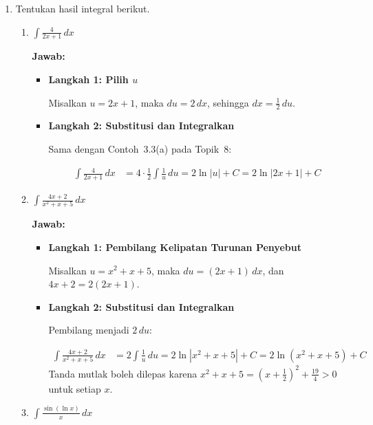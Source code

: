 \documentclass[10pt,a4paper]{article}
\newcounter{eqblock}
\newcommand{\reseteq}{%
  \stepcounter{eqblock}%
  \setcounter{equation}{0}%
  \renewcommand{\theHequation}{\arabic{eqblock}.\arabic{equation}}%
}
\begin{document}
\begin{enumerate}
\begin{enumerate}
\end{enumerate}

\item Tentukan hasil integral berikut.
\begin{enumerate}

\item $\displaystyle\int \frac{4}{2x + 1}\, dx$

\textbf{Jawab:}
\begin{itemize}
\item \textbf{Langkah 1: Pilih $u$}

Misalkan $u = 2x + 1$, maka $du = 2\, dx$, sehingga $dx = \frac{1}{2}\, du$.

\item \textbf{Langkah 2: Substitusi dan Integralkan}

Sama dengan Contoh~3.3(a) pada Topik~8:
\reseteq
\begin{align}
\int \frac{4}{2x + 1}\, dx &= 4 \cdot \frac{1}{2}\int \frac{1}{u}\, du = 2\ln|u| + C = 2\ln|2x + 1| + C
\end{align}
\end{itemize}

\item $\displaystyle\int \frac{4x + 2}{x^2 + x + 5}\, dx$

\textbf{Jawab:}
\begin{itemize}
\item \textbf{Langkah 1: Pembilang Kelipatan Turunan Penyebut}

Misalkan $u = x^2 + x + 5$, maka $du = (2x + 1)\, dx$, dan $4x + 2 = 2(2x + 1)$.

\item \textbf{Langkah 2: Substitusi dan Integralkan}

Pembilang menjadi $2\, du$:
\reseteq
\begin{align}
\int \frac{4x + 2}{x^2 + x + 5}\, dx &= 2\int \frac{1}{u}\, du = 2\ln|x^2 + x + 5| + C = 2\ln(x^2 + x + 5) + C
\end{align}
Tanda mutlak boleh dilepas karena $x^2 + x + 5 = \left(x + \frac{1}{2}\right)^2 + \frac{19}{4} > 0$ untuk setiap $x$.
\end{itemize}

\item $\displaystyle\int \frac{\sin(\ln x)}{x}\, dx$


\end{enumerate}
\end{enumerate}
\end{document}
